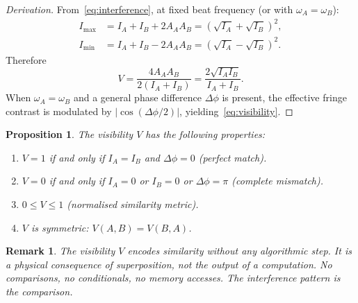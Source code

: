\documentclass[11pt,twocolumn,a4paper]{article}
\newtheorem{proposition}[theorem]{Proposition}
\newtheorem{remark}[theorem]{Remark}
\begin{document}
\begin{proof}[Derivation]
From~\eqref{eq:interference}, at fixed beat frequency (or with $\omega_A = \omega_B$):
\begin{align}
    I_{\max} &= I_A + I_B + 2A_A A_B = (\sqrt{I_A} + \sqrt{I_B})^2, \\
    I_{\min} &= I_A + I_B - 2A_A A_B = (\sqrt{I_A} - \sqrt{I_B})^2.
\end{align}
Therefore
\begin{equation}
    V = \frac{4A_A A_B}{2(I_A + I_B)} = \frac{2\sqrt{I_A I_B}}{I_A + I_B}.
\end{equation}
When $\omega_A = \omega_B$ and a general phase difference $\Delta\phi$ is present, the effective fringe contrast is modulated by $|\cos(\Delta\phi/2)|$, yielding~\eqref{eq:visibility}.
\end{proof}

\begin{proposition}\label{prop:visibility_properties}
The visibility $V$ has the following properties:
\begin{enumerate}[label=(\roman*)]
    \item $V = 1$ if and only if $I_A = I_B$ and $\Delta\phi = 0$ (perfect match).
    \item $V = 0$ if and only if $I_A = 0$ or $I_B = 0$ or $\Delta\phi = \pi$ (complete mismatch).
    \item $0 \leq V \leq 1$ (normalised similarity metric).
    \item $V$ is symmetric: $V(A, B) = V(B, A)$.
\end{enumerate}
\end{proposition}

\begin{remark}
The visibility $V$ encodes similarity \emph{without any algorithmic step}. It is a physical consequence of superposition, not the output of a computation. No comparisons, no conditionals, no memory accesses. The interference pattern \emph{is} the comparison.
\end{remark}
\end{document}
